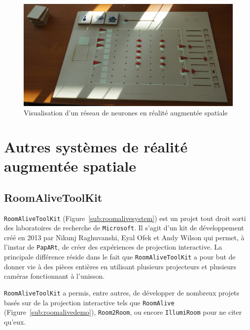\begin{figure}[H]
\centering
\includegraphics[width=0.65\linewidth]{images/neural-network}
\caption{Visualisation d'un réseau de neurones en réalité augmentée spatiale\protect\footnotemark}
\label{fig:neuralnetwork}
\end{figure}


\section{Autres systèmes de réalité augmentée spatiale}
\label{sec:SARother}

\subsection{RoomAliveToolKit} 
\texttt{RoomAliveToolKit}\cite{Jones:2014:RME:2642918.2647383} (Figure~\ref{sub:roomalivesystem}) est un projet tout droit sorti des laboratoires de recherche de \texttt{Microsoft}. Il s'agit d'un kit de développement créé en 2013 par Nikunj Raghuvanshi, Eyal Ofek et Andy Wilson qui permet, à l'instar de \texttt{\texttt{PapARt}}, de créer des expériences de projection interactive. La principale différence réside dans le fait que \texttt{RoomAliveToolKit} a pour but de donner vie à des pièces entières en utilisant plusieurs projecteurs et plusieurs caméras fonctionnant à l'unisson.

\texttt{RoomAliveToolKit} a permis, entre autres, de développer de nombreux projets basés sur de la projection interactive tels que \texttt{RoomAlive} (Figure~\ref{sub:roomalivedemo}), \texttt{Room2Room}, ou encore \texttt{IllumiRoom} pour ne citer qu'eux.


